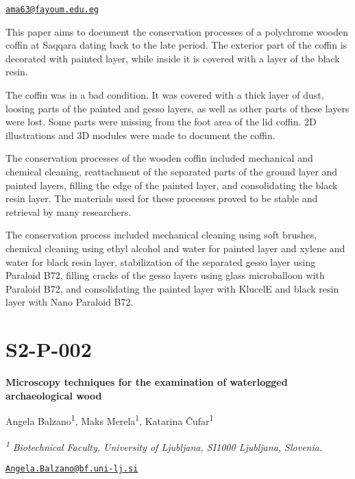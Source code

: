 \documentclass[
]{book}
\begin{document}
\href{mailto:ama63@fayoum.edu.eg}{\nolinkurl{ama63@fayoum.edu.eg}}

This paper aims to document the conservation processes of a polychrome wooden coffin at Saqqara dating back to the late period. The exterior part of the coffin is decorated with painted layer, while inside it is covered with a layer of the black resin.

The coffin was in a bad condition. It was covered with a thick layer of dust, loosing parts of the painted and gesso layers, as well as other parts of these layers were lost. Some parts were missing from the foot area of the lid coffin. 2D illustrations and 3D modules were made to document the coffin.

The conservation processes of the wooden coffin included mechanical and chemical cleaning, reattachment of the separated parts of the ground layer and painted layers, filling the edge of the painted layer, and consolidating the black resin layer. The materials used for these processes proved to be stable and retrieval by many researchers.

The conservation process included mechanical cleaning using soft brushes, chemical cleaning using ethyl alcohol and water for painted layer and xylene and water for black resin layer, stabilization of the separated gesso layer using Paraloid B72, filling cracks of the gesso layers using glass microballoon with Paraloid B72, and consolidating the painted layer with KlucelE and black resin layer with Nano Paraloid B72.

\hypertarget{s2-p-002}{%
\section*{S2-P-002}\label{s2-p-002}}

\textbf{Microscopy techniques for the examination of waterlogged archaeological wood}

Angela Balzano\textsuperscript{1}, Maks Merela\textsuperscript{1}, Katarina Čufar\textsuperscript{1}

\textsuperscript{\emph{1}} \emph{Biotechnical Faculty, University of Ljubljana, SI1000 Ljubljana, Slovenia.}

\href{mailto:Angela.Balzano@bf.uni-lj.si}{\nolinkurl{Angela.Balzano@bf.uni-lj.si}}
\end{document}
